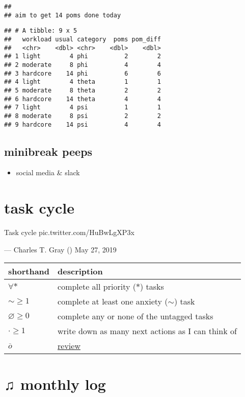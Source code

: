\documentclass[]{book}
\providecommand{\tightlist}{%
  \setlength{\itemsep}{0pt}\setlength{\parskip}{0pt}}
\begin{document}
\begin{verbatim}
## 
## aim to get 14 poms done today
\end{verbatim}

\begin{verbatim}
## # A tibble: 9 x 5
##   workload usual category  poms pom_diff
##   <chr>    <dbl> <chr>    <dbl>    <dbl>
## 1 light        4 phi          2        2
## 2 moderate     8 phi          4        4
## 3 hardcore    14 phi          6        6
## 4 light        4 theta        1        1
## 5 moderate     8 theta        2        2
## 6 hardcore    14 theta        4        4
## 7 light        4 psi          1        1
## 8 moderate     8 psi          2        2
## 9 hardcore    14 psi          4        4
\end{verbatim}

\hypertarget{minibreak-peeps}{%
\subsection{minibreak peeps}\label{minibreak-peeps}}

\begin{itemize}
\tightlist
\item
  social media \& slack
\end{itemize}

\hypertarget{task-cycle}{%
\section{task cycle}\label{task-cycle}}

Task cycle pic.twitter.com/HuBwLgXP3x

--- Charles T. Gray (\citet{cantabile}) May 27, 2019

\begin{longtable}[]{@{}ll@{}}
\toprule
shorthand & description\tabularnewline
\midrule
\endhead
\(\forall *\) & complete all priority (\(*\)) tasks\tabularnewline
\(\sim \geqslant 1\) & complete at least one anxiety (\(\sim\)) task\tabularnewline
\(\varnothing \geqslant 0\) & complete any or none of the untagged tasks\tabularnewline
\(\cdot \geqslant 1\) & write down as many next actions as I can think of\tabularnewline
\(\overline o\) & \protect\hyperlink{review}{review}\tabularnewline
\bottomrule
\end{longtable}

\hypertarget{monthly-log}{%
\section{♫ monthly log}\label{monthly-log}}
\end{document}

